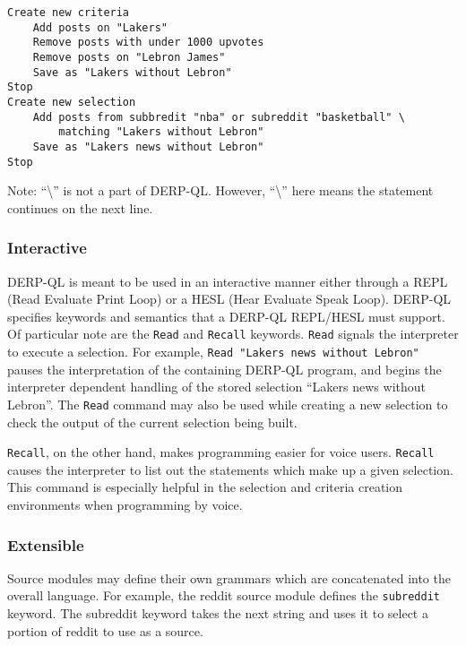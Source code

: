 \begin{lstlisting}
Create new criteria
    Add posts on "Lakers"
    Remove posts with under 1000 upvotes
    Remove posts on "Lebron James"
    Save as "Lakers without Lebron"
Stop
Create new selection
    Add posts from subbredit "nba" or subreddit "basketball" \ 
        matching "Lakers without Lebron"
    Save as "Lakers news without Lebron"
Stop
\end{lstlisting}
Note: ``\textbackslash'' is not a part of DERP-QL. However, ``\textbackslash'' here means the statement continues on the next line.

\subsubsection{Interactive}
DERP-QL is meant to be used in an interactive manner either through a REPL (Read Evaluate Print Loop) or a HESL (Hear Evaluate Speak Loop). DERP-QL specifies keywords and semantics that a DERP-QL REPL/HESL must support. Of particular note are the \texttt{Read} and \texttt{Recall} keywords. \texttt{Read} signals the interpreter to execute a selection. For example, \texttt{Read "Lakers news without Lebron"} pauses the interpretation of the containing DERP-QL program, and begins the interpreter dependent handling of the stored selection ``Lakers news without Lebron''. The \texttt{Read} command may also be used while creating a new selection to check the output of the current selection being built. 

\texttt{Recall}, on the other hand, makes programming easier for voice users. \texttt{Recall} causes the interpreter to list out the statements which make up a given selection. This command is especially helpful in the selection and criteria creation environments when programming by voice. 

\subsubsection{Extensible}\label{sssec:Extensible}
Source modules may define their own grammars which are concatenated into the overall language. For example, the reddit source module defines the \texttt{subreddit} keyword. The subreddit keyword takes the next string and uses it to select a portion of reddit to use as a source.

